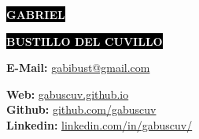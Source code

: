 \documentclass[9pt]{developercv} %
\begin{document}




\begin{minipage}[t]{0.45\textwidth} %
	\vspace{-\baselineskip} %
	
	\colorbox{black}{{\huge\textcolor{white}{\textbf{\MakeUppercase{Gabriel}}}}} %
	
	\colorbox{black}{{\huge\textcolor{white}{\textbf{\MakeUppercase{Bustillo del Cuvillo}}}}} %
	
	\vspace{6pt}
	
	{\huge \GetTitleLocalized{\langsa}{\jobtype}} %
\end{minipage}
\begin{minipage}[t]{0.233\textwidth} %
	\vspace{-\baselineskip} %
	
	\GetLocationLocalized{\langsa}
	\textbf{E-Mail: }{\href{mailto:gabibust@gmail.com}{gabibust@gmail.com}}\\	
\end{minipage}
\begin{minipage}[t]{0.30\textwidth} %
	\vspace{-\baselineskip} %
	
	\textbf{Web: }{\href{https://gabuscuv.github.io}{gabuscuv.github.io}}\\
	\textbf{Github: }{\href{https://github.com/gabuscuv}{github.com/gabuscuv}}\\
	\textbf{Linkedin: }{\href{https://www.linkedin.com/in/gabuscuv/}{linkedin.com/in/gabuscuv/}}\\
\end{minipage}
\end{document}
